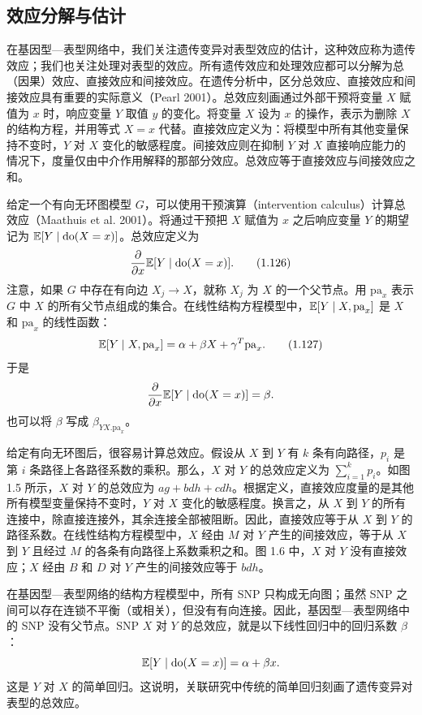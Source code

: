 \subsection{效应分解与估计}

在基因型—表型网络中，我们关注遗传变异对表型效应的估计，这种效应称为遗传效应；我们也关注处理对表型的效应。所有遗传效应和处理效应都可以分解为总（因果）效应、直接效应和间接效应。在遗传分析中，区分总效应、直接效应和间接效应具有重要的实际意义（Pearl 2001）。总效应刻画通过外部干预将变量 $X$ 赋值为 $x$ 时，响应变量 $Y$ 取值 $y$ 的变化。将变量 $X$ 设为 $x$ 的操作，表示为删除 $X$ 的结构方程，并用等式 $X=x$ 代替。直接效应定义为：将模型中所有其他变量保持不变时，$Y$ 对 $X$ 变化的敏感程度。间接效应则在抑制 $Y$ 对 $X$ 直接响应能力的情况下，度量仅由中介作用解释的那部分效应。总效应等于直接效应与间接效应之和。

给定一个有向无环图模型 $G$，可以使用干预演算（intervention calculus）计算总效应（Maathuis et al. 2001）。将通过干预把 $X$ 赋值为 $x$ 之后响应变量 $Y$ 的期望记为 $\mathbb{E}[Y\mid\mathrm{do}(X=x)]$。总效应定义为
\begin{equation}
\frac{\partial}{\partial x}\mathbb{E}[Y\mid\mathrm{do}(X=x)].
\tag{1.126}
\end{equation}
注意，如果 $G$ 中存在有向边 $X_j\to X$，就称 $X_j$ 为 $X$ 的一个父节点。用 $\mathrm{pa}_x$ 表示 $G$ 中 $X$ 的所有父节点组成的集合。在线性结构方程模型中，$\mathbb{E}[Y\mid X,\mathrm{pa}_x]$ 是 $X$ 和 $\mathrm{pa}_x$ 的线性函数：
\begin{equation}
\mathbb{E}[Y\mid X,\mathrm{pa}_x]
=\alpha+\beta X+\gamma^T\mathrm{pa}_x.
\tag{1.127}
\end{equation}
于是
\[
\frac{\partial}{\partial x}\mathbb{E}[Y\mid\mathrm{do}(X=x)]=\beta.
\]
也可以将 $\beta$ 写成 $\beta_{YX.\mathrm{pa}_x}$。

给定有向无环图后，很容易计算总效应。假设从 $X$ 到 $Y$ 有 $k$ 条有向路径，$p_i$ 是第 $i$ 条路径上各路径系数的乘积。那么，$X$ 对 $Y$ 的总效应定义为 $\sum_{i=1}^kp_i$。如图 1.5 所示，$X$ 对 $Y$ 的总效应为 $ag+bdh+cdh$。根据定义，直接效应度量的是其他所有模型变量保持不变时，$Y$ 对 $X$ 变化的敏感程度。换言之，从 $X$ 到 $Y$ 的所有连接中，除直接连接外，其余连接全部被阻断。因此，直接效应等于从 $X$ 到 $Y$ 的路径系数。在线性结构方程模型中，$X$ 经由 $M$ 对 $Y$ 产生的间接效应，等于从 $X$ 到 $Y$ 且经过 $M$ 的各条有向路径上系数乘积之和。图 1.6 中，$X$ 对 $Y$ 没有直接效应；$X$ 经由 $B$ 和 $D$ 对 $Y$ 产生的间接效应等于 $bdh$。




在基因型—表型网络的结构方程模型中，所有 SNP 只构成无向图；虽然 SNP 之间可以存在连锁不平衡（或相关），但没有有向连接。因此，基因型—表型网络中的 SNP 没有父节点。SNP $X$ 对 $Y$ 的总效应，就是以下线性回归中的回归系数 $\beta$：
\[
\mathbb{E}[Y\mid\mathrm{do}(X=x)]=\alpha+\beta x.
\]
这是 $Y$ 对 $X$ 的简单回归。这说明，关联研究中传统的简单回归刻画了遗传变异对表型的总效应。

